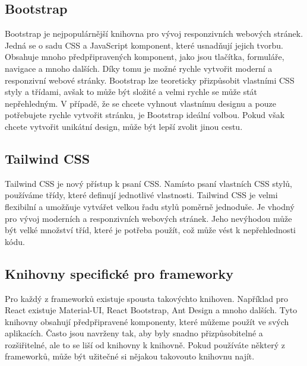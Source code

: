 \subsection*{Bootstrap}
\label{subsec:bootstrap}

Bootstrap je nejpopulárnější knihovna pro vývoj responzivních webových stránek. Jedná se o sadu CSS a JavaScript komponent, které usnadňují jejich tvorbu. Obsahuje mnoho předpřipravených komponent, jako jsou tlačítka, formuláře, navigace a mnoho dalších. Díky tomu je možné rychle vytvořit moderní a responzivní webové stránky. Bootstrap lze teoreticky přizpůsobit vlastními CSS styly a třídami, avšak to může být složité a velmi rychle se může stát nepřehledným. V případě, že se chcete vyhnout vlastnímu designu a pouze potřebujete rychle vytvořit stránku, je Bootstrap ideální volbou. Pokud však chcete vytvořit unikátní design, může být lepší zvolit jinou cestu.

\subsection*{Tailwind CSS}
\label{subsec:tailwind-css}

Tailwind CSS je nový přístup k psaní CSS. Namísto psaní vlastních CSS stylů, používáme třídy, které definují jednotlivé vlastnosti. Tailwind CSS je velmi flexibilní a umožňuje vytvářet velkou řadu stylů poměrně jednoduše. Je vhodný pro vývoj moderních a responzivních webových stránek. Jeho nevýhodou může být velké množství tříd, které je potřeba použít, což může vést k nepřehlednosti kódu.

\subsection*{Knihovny specifické pro frameworky}
\label{subsec:framework-specific-libraries}

Pro každý z frameworků existuje spousta takovýchto knihoven. Například pro React existuje Material-UI, React Bootstrap, Ant Design a mnoho dalších. Tyto knihovny obsahují předpřipravené komponenty, které můžeme použít ve svých aplikacích. Často jsou navrženy tak, aby byly snadno přizpůsobitelné a rozšiřitelné, ale to se liší od knihovny k knihovně. Pokud používáte některý z frameworků, může být užitečné si nějakou takovouto knihovnu najít.

